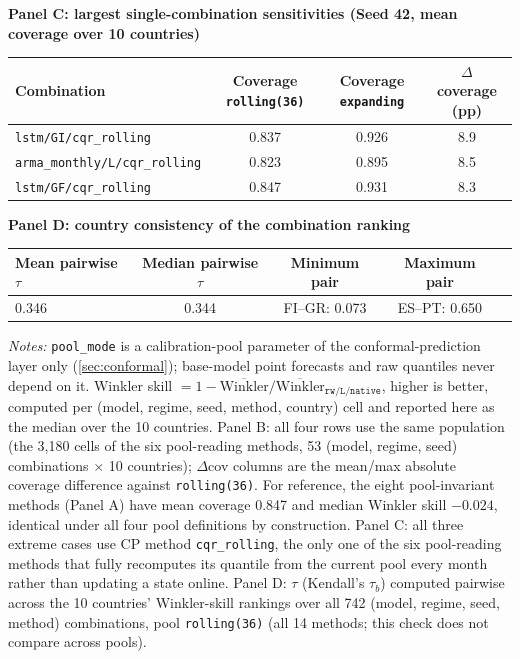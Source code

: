 \begin{table}[t]
\vspace{3mm}
\textbf{Panel C: largest single-combination sensitivities (Seed 42, mean coverage over 10 countries)}\\[1mm]
\begin{tabular}{lccc}
\toprule
Combination & Coverage \texttt{rolling(36)} & Coverage \texttt{expanding} & $\Delta$ coverage (pp) \\
\midrule
\texttt{lstm/GI/cqr\_rolling}          & 0.837 & 0.926 & 8.9 \\
\texttt{arma\_monthly/L/cqr\_rolling}  & 0.823 & 0.895 & 8.5 \\
\texttt{lstm/GF/cqr\_rolling}          & 0.847 & 0.931 & 8.3 \\
\bottomrule
\end{tabular}

\vspace{3mm}
\textbf{Panel D: country consistency of the combination ranking}\\[1mm]
\begin{tabular}{lcccc}
\toprule
Mean pairwise $\tau$ & Median pairwise $\tau$ & Minimum pair & Maximum pair \\
\midrule
0.346 & 0.344 & FI--GR: 0.073 & ES--PT: 0.650 \\
\bottomrule
\end{tabular}

\vspace{3mm}
{\footnotesize\textit{Notes:} \texttt{pool\_mode} is a calibration-pool parameter of the conformal-prediction layer only (\cref{sec:conformal}); base-model point forecasts and raw quantiles never depend on it. Winkler skill $= 1 - \overline{\text{Winkler}}/\overline{\text{Winkler}}_{\texttt{rw/L/native}}$, higher is better, computed per (model, regime, seed, method, country) cell and reported here as the median over the 10 countries. Panel B: all four rows use the same population (the 3{,}180 cells of the six pool-reading methods, 53 (model, regime, seed) combinations $\times$ 10 countries); $\Delta$cov columns are the mean/max absolute coverage difference against \texttt{rolling(36)}. For reference, the eight pool-invariant methods (Panel A) have mean coverage 0.847 and median Winkler skill $-0.024$, identical under all four pool definitions by construction. Panel C: all three extreme cases use CP method \texttt{cqr\_rolling}, the only one of the six pool-reading methods that fully recomputes its quantile from the current pool every month rather than updating a state online. Panel D: $\tau$ (Kendall's $\tau_b$) computed pairwise across the 10 countries' Winkler-skill rankings over all 742 (model, regime, seed, method) combinations, pool \texttt{rolling(36)} (all 14 methods; this check does not compare across pools).}
\end{table}


